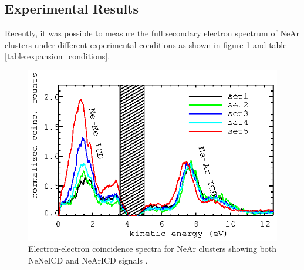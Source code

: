 \subsection{Experimental Results}
Recently, it was possible to measure the full secondary electron spectrum
of NeAr clusters under different experimental conditions as shown in figure
\ref{figure:NeAr_exp_spectrum} and table \ref{table:expansion_conditions}.

\begin{figure}[h]
  \centering
  \includegraphics[scale=1.7]{pics/exp_near_coinc_sets.eps}
  \caption{Electron-electron coincidence spectra for NeAr clusters
           showing both NeNeICD and NeArICD signals \cite{Fasshauer14_1}.}
  \label{figure:NeAr_exp_spectrum}
\end{figure}

